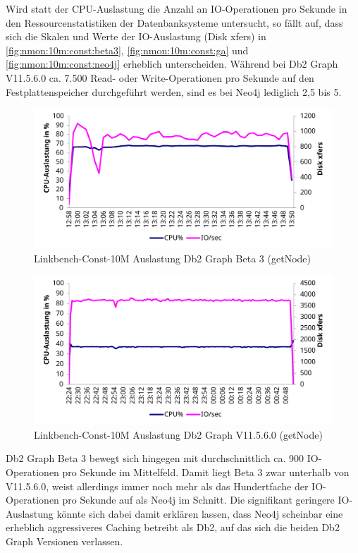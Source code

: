 Wird statt der CPU-Auslastung die Anzahl an IO-Ope\-ra\-ti\-on\-en pro Sekunde in den Ressourcenstatistiken der Datenbanksysteme untersucht, so fällt auf, dass sich die Skalen und Werte der IO-Aus\-last\-ung (Disk xfers) in \autoref{fig:nmon:10m:const:beta3}, \autoref{fig:nmon:10m:const:ga} und \autoref{fig:nmon:10m:const:neo4j} erheblich unterscheiden. Während bei Db2 Graph V11.5.6.0 ca. 7.500 Read- oder Write-Ope\-ra\-ti\-on\-en pro Sekunde auf den Festplattenspeicher durchgeführt werden, sind es bei Neo4j lediglich 2,5 bis 5. 
\begin{figure}[!ht]
    \centering
    \includegraphics[width=\textwidth]{images/stats/linkbench-10m-const_beta3.pdf}
    \caption{Linkbench-Const-10M Auslastung Db2 Graph Beta 3 (getNode)}
    \label{fig:nmon:10m:const:beta3}
\end{figure}

\begin{figure}[!ht]
    \centering
    \includegraphics[width=\textwidth]{images/stats/linkbench-10m-const_ga.pdf}
    \caption{Linkbench-Const-10M Auslastung Db2 Graph V11.5.6.0 (getNode)}
    \label{fig:nmon:10m:const:ga}
\end{figure}

Db2 Graph Beta 3 bewegt sich hingegen mit durchschnittlich ca. 900 IO-Ope\-ra\-ti\-on\-en pro Sekunde im Mittelfeld. Damit liegt Beta 3 zwar unterhalb von V11.5.6.0, weist allerdings immer noch mehr als das Hundertfache der IO-Ope\-ra\-ti\-on\-en pro Sekunde auf als Neo4j im Schnitt. Die signifikant geringere IO-Aus\-last\-ung könnte sich dabei damit erklären lassen, dass Neo4j scheinbar eine erheblich aggressiveres Caching betreibt als Db2, auf das sich die beiden Db2 Graph Versionen verlassen. 

